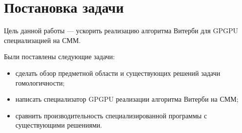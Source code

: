 \section{Постановка задачи}
Цель данной работы --- ускорить реализацию алгоритма Витерби для GPGPU специализацией на СММ.

Были поставлены следующие задачи:
\begin{itemize}
	\item сделать обзор предметной области и существующих решений задачи гомологичности;
	\item написать специализатор GPGPU реализации алгоритма Витерби на СММ;
	\item сравнить производительность специализированной программы с существующими решениями.
\end{itemize}